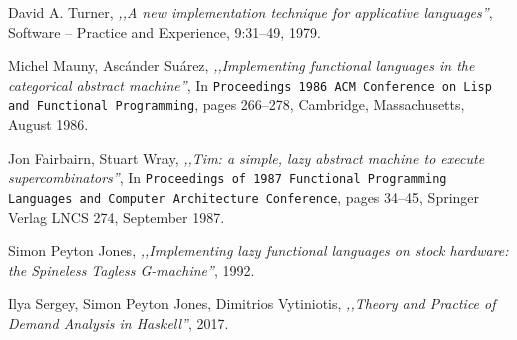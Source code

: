\documentclass[en]{pracamgr}
\begin{document}
\begin{thebibliography}{99}
 David A. Turner, \textit{,,A new implementation technique for applicative languages''}, Software -- Practice and Experience, 9:31–49, 1979.

 Michel Mauny, Asc\'ander Su\'arez, \textit{,,Implementing functional languages in the categorical abstract machine''}, In \texttt{Proceedings 1986 ACM Conference on Lisp and Functional Programming}, pages 266–278, Cambridge, Massachusetts, August 1986.

 Jon Fairbairn, Stuart Wray, \textit{,,Tim: a simple, lazy abstract machine to execute supercombinators''},  In \texttt{Proceedings of 1987 Functional Programming Languages and Computer Architecture Conference}, pages 34–45, Springer Verlag LNCS 274, September 1987.

 Simon Peyton Jones, \textit{,,Implementing lazy functional languages on stock hardware: the Spineless Tagless G-machine''}, 1992.

 Ilya Sergey, Simon Peyton Jones, Dimitrios Vytiniotis, \textit{,,Theory and Practice of Demand Analysis in Haskell''}, 2017.

\end{thebibliography}
\end{document}
